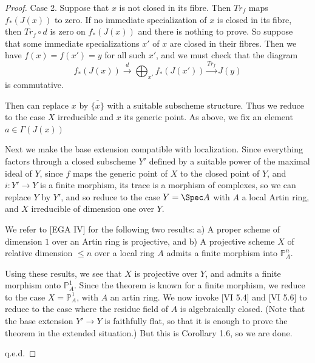 \documentclass[12pt]{book}
\begin{document}
\begin{proof}
\setcounter{page}{372}
Case 2. Suppose that \(x\) is not closed in its fibre. Then \(Tr_{f}\) maps \(f_{*}(J(x))\) to zero. If no immediate specialization of \(x\) is closed in its fibre, then \(Tr_{f} \circ d\) is zero on \(f_{*}(J(x))\) and there is nothing to prove.
So suppose that some immediate specializations \(x'\) of \(x\) are closed in their fibres. Then we have \(f(x)=f(x')=y\) for all such \(x'\), and we must check that the diagram
\[f_{*}(J(x)) \stackrel{d}{\to} \bigoplus_{x'} f_{*}(J(x')) \stackrel{Tr_f}{\to} J(y)\]
is commutative.

Then can replace \(x\) by \(\overline{\{x\}}\) with a suitable subscheme structure. Thus we reduce to the case \(X\) irreducible and \(x\) its generic point. As above, we fix an element \(a \in \Gamma(J(x))\)

\setcounter{page}{373}
Next we make the base extension compatible with localization. Since everything factors through a closed subscheme \(Y'\) defined by a suitable power of the maximal ideal of \(Y\), since \(f\) maps the generic point of \(X\) to the closed point of \(Y\), and \(i:Y'\to Y\) is a finite morphism, its trace is a morphism of complexes, so we can replace \(Y\) by \(Y'\), and so reduce to the case \(Y = \Spec A\) with \(A\) a local Artin ring, and \(X\) irreducible of dimension one over \(Y\).

We refer to [EGA IV] for the following two results:
a) A proper scheme of dimension \(1\) over an Artin ring is projective, and
b) A projective scheme \(X\) of relative dimension \(\le n\) over a local ring \(A\) admits a finite morphism into \(\mathbb{P}_{A}^{n}\).

Using these results, we see that \(X\) is projective over \(Y\), and admits a finite morphism onto \(\mathbb{P}_{A}^{1}\). Since the theorem is known for a finite morphism, we reduce to the case \(X=\mathbb{P}_{A}^{1}\), with \(A\) an artin ring. We now invoke [VI 5.4] and [VI 5.6] to reduce to the case where the residue field of \(A\) is algebraically closed. (Note that the base extension \(Y'\to Y\) is faithfully flat, so that it is enough to prove the theorem in the extended situation.) But this is Corollary 1.6, so we are done.

q.e.d.

\end{proof}
\end{document}
